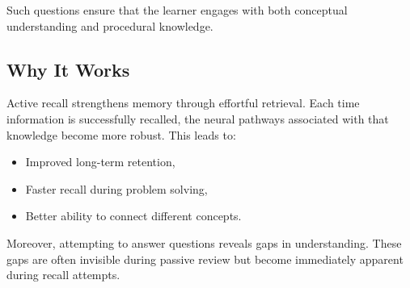 \documentclass{article}
\begin{document}
Such questions ensure that the learner engages with both conceptual understanding and procedural knowledge.

\subsection{Why It Works}

Active recall strengthens memory through effortful retrieval. Each time information is successfully recalled, the neural pathways associated with that knowledge become more robust. This leads to:
\begin{itemize}
  \item Improved long-term retention,
  \item Faster recall during problem solving,
  \item Better ability to connect different concepts.
\end{itemize}

Moreover, attempting to answer questions reveals gaps in understanding. These gaps are often invisible during passive review but become immediately apparent during recall attempts.

\clearpage

\tableofcontents

\clearpage






\clearpage


\end{document}
